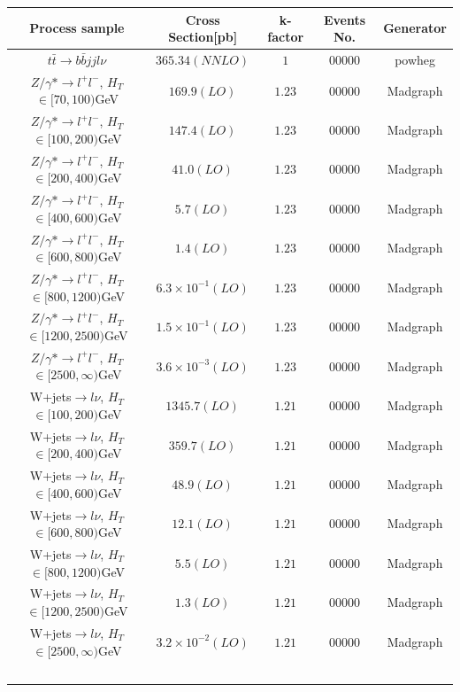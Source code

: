 \begin{center}
\begin{tabular}{ c c c c c }
\hline
Process sample & Cross Section[pb] & k-factor & Events No. & Generator \\ 
\hline
$t$$\bar{t}\rightarrow b \bar{b}jjl\nu$ & $365.34(NNLO)$ & $1$ & $00000$ & powheg \\
\hline
$Z / \gamma * \rightarrow l^+ l^-$, $H_{T}$ $\in [70,100)$GeV & $169.9(LO)$ & $1.23$ & $00000$ & Madgraph \\
$Z / \gamma * \rightarrow l^+ l^-$, $H_{T}$ $\in [100,200)$GeV & $147.4(LO)$ & $1.23$ & $00000$ & Madgraph \\
$Z / \gamma * \rightarrow l^+ l^-$, $H_{T}$ $\in [200,400)$GeV & $41.0(LO)$ & $1.23$ & $00000$ & Madgraph \\
$Z / \gamma * \rightarrow l^+ l^-$, $H_{T}$ $\in [400,600)$GeV & $5.7(LO)$ & $1.23$ & $00000$ & Madgraph \\
$Z / \gamma * \rightarrow l^+ l^-$, $H_{T}$ $\in [600,800)$GeV & $1.4(LO)$ & $1.23$ & $00000$ & Madgraph \\
$Z / \gamma * \rightarrow l^+ l^-$, $H_{T}$ $\in [800,1200)$GeV & $6.3 \times 10^{-1}(LO)$ & $1.23$ & $00000$ & Madgraph \\
$Z / \gamma * \rightarrow l^+ l^-$, $H_{T}$ $\in [1200,2500)$GeV & $1.5 \times 10^{-1}(LO)$ & $1.23$ & $00000$ & Madgraph \\
$Z / \gamma * \rightarrow l^+ l^-$, $H_{T}$ $\in [2500, \infty )$GeV & $3.6 \times 10^{-3}(LO)$ & $1.23$ & $00000$ & Madgraph \\
\hline
W+jets$\rightarrow l \nu$, $H_{T}$ $\in [100,200)$GeV & $1345.7(LO)$ & $1.21$ & $00000$ & Madgraph \\
W+jets$\rightarrow l \nu$, $H_{T}$ $\in [200,400)$GeV & $359.7(LO)$ & $1.21$ & $00000$ & Madgraph \\
W+jets$\rightarrow l \nu$, $H_{T}$ $\in [400,600)$GeV & $48.9(LO)$ & $1.21$ & $00000$ & Madgraph \\
W+jets$\rightarrow l \nu$, $H_{T}$ $\in [600,800)$GeV & $12.1(LO)$ & $1.21$ & $00000$ & Madgraph \\
W+jets$\rightarrow l \nu$, $H_{T}$ $\in [800,1200)$GeV & $5.5(LO)$ & $1.21$ & $00000$ & Madgraph \\
W+jets$\rightarrow l \nu$, $H_{T}$ $\in [1200,2500)$GeV & $1.3(LO)$ & $1.21$ & $00000$ & Madgraph \\
W+jets$\rightarrow l \nu$, $H_{T}$ $\in [2500,\infty)$GeV & $3.2 \times 10^{-2}(LO)$ & $1.21$ & $00000$ & Madgraph \\
$$
\end{tabular}
\end{center}
